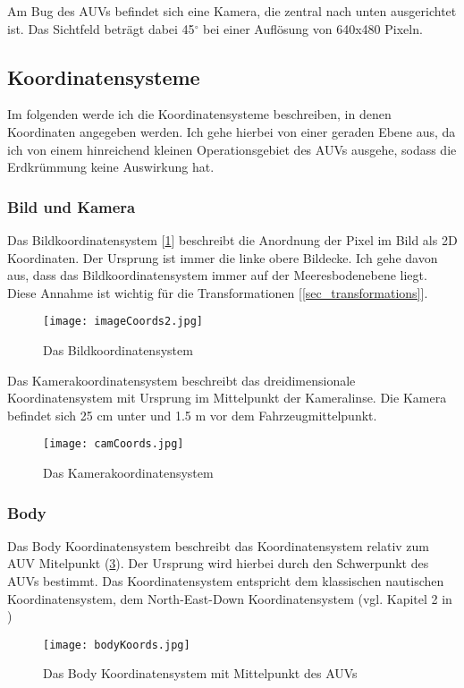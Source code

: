 Am Bug des AUVs befindet sich eine Kamera, die zentral nach unten ausgerichtet ist. Das Sichtfeld beträgt dabei 45$^\circ$ bei einer Auflösung von 640x480 Pixeln.
\subsection{Koordinatensysteme}

Im folgenden werde ich die Koordinatensysteme beschreiben, in denen Koordinaten angegeben werden. Ich gehe hierbei von einer geraden Ebene aus, da ich von einem hinreichend kleinen Operationsgebiet des AUVs ausgehe, sodass die Erdkrümmung keine Auswirkung hat.
\subsubsection{Bild und Kamera}
\label{sec_img_cam_coords}
Das Bildkoordinatensystem [\ref{imageKoords}] beschreibt die Anordnung der Pixel im Bild als 2D Koordinaten. Der Ursprung ist immer die linke obere Bildecke. Ich gehe davon aus, dass das Bildkoordinatensystem immer auf der Meeresbodenebene liegt. Diese Annahme ist wichtig für die Transformationen [\ref{sec_transformations}].
\begin{figure}[H]
	\centering
	\texttt{[image: imageCoords2.jpg]}
	\caption{Das Bildkoordinatensystem}
	\label{imageKoords}
\end{figure}
Das Kamerakoordinatensystem beschreibt das dreidimensionale Koordinatensystem mit Ursprung im Mittelpunkt der Kameralinse. Die Kamera befindet sich 25 cm unter und 1.5 m vor dem Fahrzeugmittelpunkt.
\begin{figure}[H]
	\centering
	\texttt{[image: camCoords.jpg]}
	\caption{Das Kamerakoordinatensystem}
	\label{CamKoords}
\end{figure}

\subsubsection{Body}
Das Body Koordinatensystem beschreibt das Koordinatensystem relativ zum AUV Mitelpunkt (\ref{Abb. 1}).
Der Ursprung wird hierbei durch den Schwerpunkt des AUVs bestimmt.
Das Koordinatensystem entspricht dem klassischen nautischen Koordinatensystem, dem North-East-Down Koordinatensystem (vgl. Kapitel 2 in \cite{cai2011unmanned})
\begin{figure}[H]
	\centering
	\texttt{[image: bodyKoords.jpg]}
	\caption{Das Body Koordinatensystem mit Mittelpunkt des AUVs}
	\label{Abb. 1}
\end{figure}

